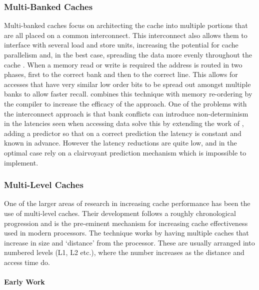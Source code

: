 \subsubsection{Multi-Banked Caches}

Multi-banked caches focus on architecting the cache into multiple portions that are all placed on a common interconnect. This interconnect also allows them to interface with several load and store units, increasing the potential for cache parallelism and, in the best case, spreading the data more evenly throughout the cache \cite{riversHighbandwidthDataCache1997}. When a memory read or write is required the address is routed in two phases, first to the correct bank and then to the correct line. This allows for accesses that have very similar low order bits to be spread out amongst multiple banks to allow faster recall. \citet{riversHighbandwidthDataCache1997} combines this technique with memory re-ordering by the compiler to increase the efficacy of the approach. One of the problems with the interconnect approach is that bank conflicts can introduce non-determinism in the latencies seen when accessing data \citet{neefsTechniqueHighBandwidth2000} solve this by extending the work of  \citeauthor{riversHighbandwidthDataCache1997}, adding a predictor so that on a correct prediction the latency is constant and known in advance. However the latency reductions are quite low, and in the optimal case rely on a clairvoyant prediction mechanism which is impossible to implement.

\subsubsection{Multi-Level Caches}
\label{sec:multi-level}
One of the larger areas of research in increasing cache performance has been the use of multi-level caches. Their development follows a roughly chronological progression and is the pre-eminent mechanism for increasing cache effectiveness used in modern processors. The technique works by having multiple caches that increase in size and `distance' from the processor. These are usually arranged into numbered levels (L1, L2 etc.), where the number increases as the distance and access time do. 

\paragraph{Early Work}

